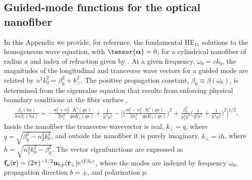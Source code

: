 \documentclass[preprint, aps,pra,onecolumn]{revtex4-1} %
\begin{document}
\begin{appendix}	


\section{Guided-mode functions for the optical nanofiber} \label{Appendix::ModeFunctions}

  

In this Appendix we provide, for reference, the fundamental HE$_{11}$ solutions to the homogeneous wave equation,  with $\tensor{\boldsymbol{\alpha}} = 0$, for a cylindrical nanofiber of radius $a$ and index of refraction given by .  At a given frequency, $\omega_0 = c k_0$, the magnitudes of the longitudinal and transverse wave vectors for a guided mode are related by $n^2 k_0^2 = \beta_0^2 + k_\perp^2$.  
The positive propagation constant, $\beta_0 \equiv \beta(\omega_0)$, is determined from the eigenvalue equation that results from enforcing physical boundary conditions at the fiber surface \cite{snyder_optical_1983},
	\begin{align}
		\frac{J_0(ha)}{ha J_1(ha)} = - \frac{n_1^2+n_2^2}{2n_1^2} \frac{K'(qa)}{qa K_1(qa)} + \frac{1}{h^2 a^2} - \bigg[ \bigg(\frac{n_1^2 - n_2^2}{2 n_1^2} \frac{K'(qa)}{qa K_1(qa)} \bigg)^2  + \frac{\beta_0^2}{n^2_1 k^2} \bigg(\frac{1}{q^2a^2} + \frac{1}{h^2a^2} \bigg)^2 \bigg]^{1/2}.
	\end{align}
Inside the nanofiber the transverse wavevector is real, $k_\perp = q$, where $q=\sqrt{\beta_0^2- n_2^2k_0^2}$, and outside the nanofiber it is purely imaginary, $k_\perp = i h$, where $h=\sqrt{n_1^2 k_0^2 - \beta_0^2}$.  The vector eigenfunctions are expressed as $\mathbf{f}_{\mu}(\mathbf{r}) = (2\pi)^{-1/2}\mathbf{u}_{b,p}(\mathbf{r}_\perp) e^{i f \beta_0 z}$, where the modes are indexed by frequency $\omega_0$, propagation direction $b = \pm$, and polarization $p$.


\end{appendix}
\end{document}
